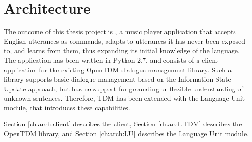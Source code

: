 
\chapter{Architecture} %

\label{ch:arch} %



The outcome of this thesis project is \pname, a music player application that accepts English utterances as commands, adapts to utterances it has never been exposed to, and learns from them, thus expanding its initial knowledge of the language. The application has been written in Python 2.7, and consists of a client application for the existing OpenTDM dialogue management library. Such a library supports basic dialogue management based on the Information State Update approach, but has no support for grounding or flexible understanding of unknown sentences. Therefore, TDM has been extended with the Language Unit module, that introduces these capabilities.

Section \ref{ch:arch:client} describes the \pname client, Section \ref{ch:arch:TDM} describes the OpenTDM library, and Section \ref{ch:arch:LU} describes the Language Unit module.



